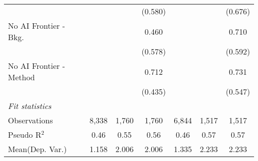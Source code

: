 \begin{tabular}{lcccccc}
                           &               &             & (0.580)      &              &         & (0.676)\\   
   No AI Frontier - Bkg.   &               &             & 0.460        &              &         & 0.710\\   
                           &               &             & (0.578)      &              &         & (0.592)\\   
   No AI Frontier - Method &               &             & 0.712        &              &         & 0.731\\   
                           &               &             & (0.435)      &              &         & (0.547)\\   
   \midrule
   \emph{Fit statistics}\\
   Observations            & 8,338         & 1,760       & 1,760        & 6,844        & 1,517   & 1,517\\  
   Pseudo R$^2$            & 0.46          & 0.55        & 0.56         & 0.46         & 0.57    & 0.57\\  
Mean(Dep. Var.) & 1.158 & 2.006 & 2.006 & 1.335 & 2.233 & 2.233 \\
   

\end{tabular}
